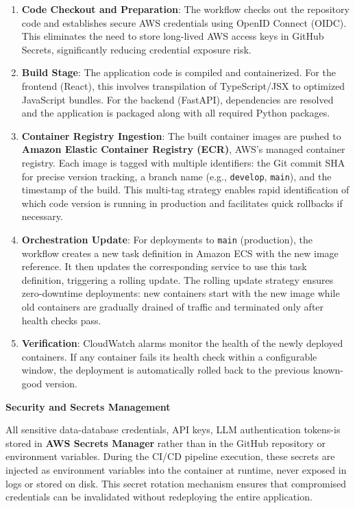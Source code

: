 \begin{enumerate}
    \item \textbf{Code Checkout and Preparation}: The workflow checks out the repository code and establishes secure AWS credentials using OpenID Connect (OIDC). This eliminates the need to store long-lived AWS access keys in GitHub Secrets, significantly reducing credential exposure risk.
    
    \item \textbf{Build Stage}: The application code is compiled and containerized. For the frontend (React), this involves transpilation of TypeScript/JSX to optimized JavaScript bundles. For the backend (FastAPI), dependencies are resolved and the application is packaged along with all required Python packages.
    
    \item \textbf{Container Registry Ingestion}: The built container images are pushed to \textbf{Amazon Elastic Container Registry (ECR)}, AWS's managed container registry. Each image is tagged with multiple identifiers: the Git commit SHA for precise version tracking, a branch name (e.g., \texttt{develop}, \texttt{main}), and the timestamp of the build. This multi-tag strategy enables rapid identification of which code version is running in production and facilitates quick rollbacks if necessary.
    
    \item \textbf{Orchestration Update}: For deployments to \texttt{main} (production), the workflow creates a new task definition in Amazon ECS with the new image reference. It then updates the corresponding service to use this task definition, triggering a rolling update. The rolling update strategy ensures zero-downtime deployments: new containers start with the new image while old containers are gradually drained of traffic and terminated only after health checks pass.
    
    \item \textbf{Verification}: CloudWatch alarms monitor the health of the newly deployed containers. If any container fails its health check within a configurable window, the deployment is automatically rolled back to the previous known-good version.
\end{enumerate}

\textbf{Security and Secrets Management}

All sensitive data-database credentials, API keys, LLM authentication tokens-is stored in \textbf{AWS Secrets Manager} rather than in the GitHub repository or environment variables. During the CI/CD pipeline execution, these secrets are injected as environment variables into the container at runtime, never exposed in logs or stored on disk. This secret rotation mechanism ensures that compromised credentials can be invalidated without redeploying the entire application.

